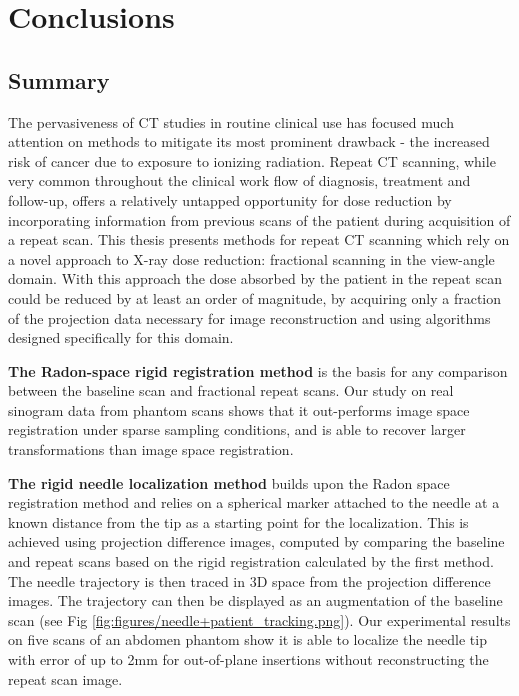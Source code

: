 \chapter{Conclusions}

\label{ch:conclusions}

\section{Summary}

The pervasiveness of CT studies in routine clinical use has focused much attention on methods to mitigate its most prominent drawback - the increased risk of cancer due to exposure to ionizing radiation. 
Repeat CT scanning, while very common throughout the clinical work flow of diagnosis, treatment and follow-up, offers a relatively untapped opportunity for dose reduction by incorporating information from previous scans of the patient during acquisition of a repeat scan.
This thesis presents methods for repeat CT scanning which rely on a novel approach to X-ray dose reduction: fractional scanning in the view-angle domain. With this approach the dose absorbed by the patient in the repeat scan could be reduced by at least an order of magnitude, by acquiring only a fraction of the projection data necessary for image reconstruction and using algorithms designed specifically for this domain.

\textbf{The Radon-space rigid registration method} is the basis for any comparison between the baseline scan and fractional repeat scans.
Our study on real sinogram data from phantom scans shows that it out-performs image space registration under sparse sampling conditions, and is able to recover larger transformations than image space registration.

\textbf{The rigid needle localization method} builds upon the Radon space registration method and relies on a spherical marker attached to the needle at a known distance from the tip as a starting point for the localization. This is achieved using projection difference images, computed by comparing the baseline and repeat scans based on the rigid registration calculated by the first method. The needle trajectory is then traced in 3D space from the projection difference images. The trajectory can then be displayed as an augmentation of the baseline scan (see Fig \ref{fig:figures/needle+patient_tracking.png}). Our experimental results on five scans of an abdomen phantom show it is able to localize the needle tip with error of up to 2mm for out-of-plane insertions without reconstructing the repeat scan image.

